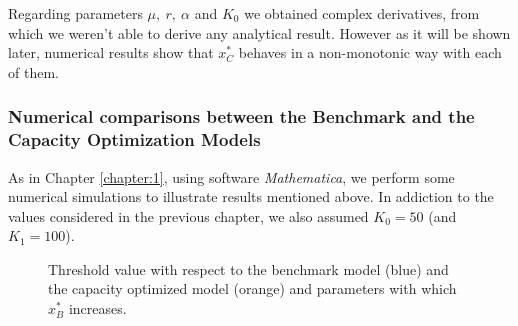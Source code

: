 Regarding parameters $\mu, \ r, \ \alpha$ and $K_0$ we obtained complex derivatives, from which we weren't able to derive any analytical result. However as it will be shown later, numerical results show that $x_C^*$ behaves in a non-monotonic way with each of them.





\subsubsection{Numerical comparisons between the Benchmark and the Capacity Optimization Models}

As in Chapter \ref{chapter:1}, using software \textit{Mathematica}, we perform some numerical simulations to illustrate results mentioned above. 
In addiction to the values considered in the previous chapter, we also assumed $K_0=50$ (and $K_1=100$).



\begin{figure}[!htb]
	\begin{subfigmatrix}{2}
	\end{subfigmatrix}
	\caption{Threshold value with respect to the benchmark model (blue) and the capacity optimized model (orange) and parameters with which $x^*_B$ increases.}
	\label{fig:2_x2}
\end{figure}


